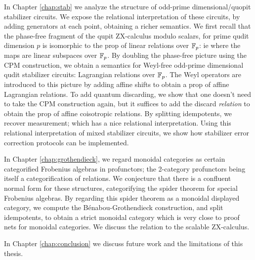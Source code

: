 \documentclass[12pt]{ociamthesis}  %
\begin{document}
In Chapter \ref{chap:stab}  we analyze the structure of odd-prime dimensional/quopit stabilizer circuits.
We expose the relational interpretation of these circuits, by adding generators at each point, obtaining a richer semantics.  We first recall that the phase-free fragment of the qupit ZX-calculus modulo scalars, for prime qudit dimension $p$ is isomorphic to the prop of linear relations over $\mathbb{F}_p$: ie where the maps are linear subspaces over $\mathbb{F}_p$.  By doubling the phase-free picture using the CPM construction, we obtain a semantics for Weyl-free odd-prime dimensional qudit stabilizer circuits: Lagrangian relations over $\mathbb{F}_p$.  The Weyl operators are introduced to this picture by adding affine shifts to obtain a prop of affine Lagrangian relations. To add quantum discarding, we show that one doesn't need to take the CPM construction again, but it suffices to add the discard {\em relation} to obtain the prop of affine coisotropic relations.  By splitting idempotents, we recover measurement; which has a nice relational interpretation.  Using this relational interpretation of mixed stabilizer circuits, we show how stabilizer error correction protocols can be implemented.


In Chapter \ref{chap:grothendieck}, we regard monoidal categories as certain categorified Frobenius algebras in profunctors; the 2-category profunctors being itself a categorification of relations.  We conjecture that there is a confluent normal form for these structures, categorifying the spider theorem for special Frobenius algebras.  By regarding this spider theorem as a monoidal displayed category, we compute the B\'enabou-Grothendieck construction, and split idempotents, to obtain a strict monoidal category which is very close to proof nets for monoidal categories. We discuss the relation to the scalable ZX-calculus.

In Chapter \ref{chap:conclusion} we discuss future work and the limitations of this thesis.
\end{document}
